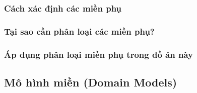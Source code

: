 \documentclass{report} %
\begin{document}
% 


% 


\subsubsection{Cách xác định các miền phụ}



\newpage

\subsubsection{Tại sao cần phân loại các miền phụ?}

% 

\subsubsection{Áp dụng phân loại miền phụ trong đồ án này}

% 

\subsection{Mô hình miền (Domain Models)}


% 

\end{document}

